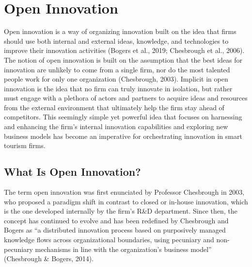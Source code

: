\documentclass[
  letterpaper,
  DIV=11,
  numbers=noendperiod]{scrreprt}
\begin{document}
\hypertarget{open-innovation}{%
\chapter{Open Innovation}\label{open-innovation}}

Open innovation is a way of organizing innovation built on the idea that
firms should use both internal and external ideas, knowledge, and
technologies to improve their innovation activities (Bogers et al.,
2019; Chesbrough et al., 2006). The notion of open innovation is built
on the assumption that the best ideas for innovation are unlikely to
come from a single firm, nor do the most talented people work for only
one organization (Chesbrough, 2003). Implicit in open innovation is the
idea that no firm can truly innovate in isolation, but rather must
engage with a plethora of actors and partners to acquire ideas and
resources from the external environment that ultimately help the firm
stay ahead of competitors. This seemingly simple yet powerful idea that
focuses on harnessing and enhancing the firm's internal innovation
capabilities and exploring new business models has become an imperative
for orchestrating innovation in smart tourism firms.

\hypertarget{what-is-open-innovation}{%
\section{What Is Open Innovation?}\label{what-is-open-innovation}}

The term open innovation was first enunciated by Professor Chesbrough in
2003, who proposed a paradigm shift in contrast to closed or in-house
innovation, which is the one developed internally by the firm's R\&D
department. Since then, the concept has continued to evolve and has been
redefined by Chesbrough and Bogers as ``a distributed innovation process
based on purposively managed knowledge flows across organizational
boundaries, using pecuniary and non-pecuniary mechanisms in line with
the organization's business model'' (Chesbrough \& Bogers, 2014).
\end{document}
